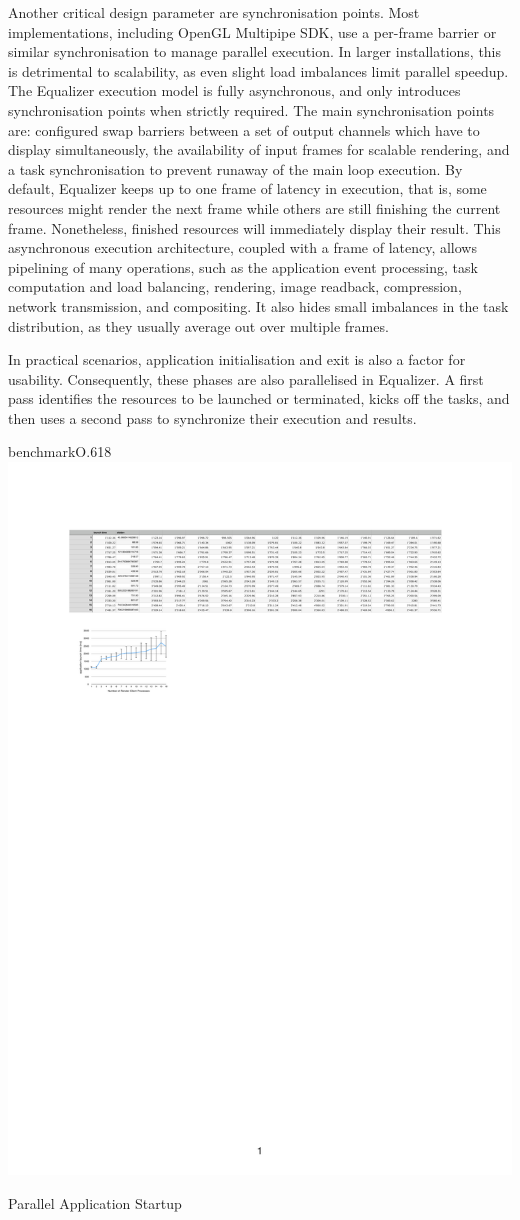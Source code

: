 Another critical design parameter are synchronisation points. Most
implementations, including OpenGL Multipipe SDK, use a per-frame barrier or
similar synchronisation to manage parallel execution. In larger installations,
this is detrimental to scalability, as even slight load imbalances limit
parallel speedup. The Equalizer execution model is fully asynchronous, and only
introduces synchronisation points when strictly required. The main
synchronisation points are: configured swap barriers between a set of output
channels which have to display simultaneously, the availability of input frames
for scalable rendering, and a task synchronisation to prevent runaway of the
main loop execution. By default, Equalizer keeps up to one frame of latency in
execution, that is, some resources might render the next frame while others are
still finishing the current frame. Nonetheless, finished resources will
immediately display their result. This asynchronous execution architecture,
coupled with a frame of latency, allows pipelining of many operations, such as
the application event processing, task computation and load balancing,
rendering, image readback, compression, network transmission, and compositing.
It also hides small imbalances in the task distribution, as they usually average
out over multiple frames.

In practical scenarios, application initialisation and exit is also a factor
for usability. Consequently, these phases are also parallelised in Equalizer. A
first pass identifies the resources to be launched or terminated, kicks off the
tasks, and then uses a second pass to synchronize their execution and results.

\begin{wrapfloat}{benchmark}{O}{.618\textwidth}
 \includegraphics[width=.618\textwidth]{results/launch}
 {\caption{\label{rLaunch}Parallel Application Startup}}
\end{wrapfloat}


